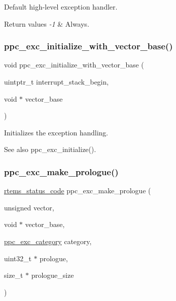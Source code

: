 Default high-\/level exception handler. 


\begin{DoxyRetVals}{Return values}
{\em -\/1} & Always. \\
\hline
\end{DoxyRetVals}
\mbox{\label{group__ppc__exc_ga29db27edaf745d8e0101ba4c4d8fddd2}} 
\subsubsection{\texorpdfstring{ppc\_exc\_initialize\_with\_vector\_base()}{ppc\_exc\_initialize\_with\_vector\_base()}}
{\footnotesize\ttfamily void ppc\+\_\+exc\+\_\+initialize\+\_\+with\+\_\+vector\+\_\+base (\begin{DoxyParamCaption}\item[{uintptr\+\_\+t}]{interrupt\+\_\+stack\+\_\+begin,  }\item[{void $\ast$}]{vector\+\_\+base }\end{DoxyParamCaption})}



Initializes the exception handling. 

\begin{DoxySeeAlso}{See also}
ppc\+\_\+exc\+\_\+initialize(). 
\end{DoxySeeAlso}
\mbox{\label{group__ppc__exc_gac2b2347bcb0a4b1e24af8eebf12197f3}} 
\subsubsection{\texorpdfstring{ppc\_exc\_make\_prologue()}{ppc\_exc\_make\_prologue()}}
{\footnotesize\ttfamily \mbox{\hyperlink{group__ClassicStatus_ga545d41846817eaba6143d52ee4d9e9fe}{rtems\+\_\+status\+\_\+code}} ppc\+\_\+exc\+\_\+make\+\_\+prologue (\begin{DoxyParamCaption}\item[{unsigned}]{vector,  }\item[{void $\ast$}]{vector\+\_\+base,  }\item[{\mbox{\hyperlink{group__ppc__exc_gab5c9ba70d9560d278d06983d7ea3babe}{ppc\+\_\+exc\+\_\+category}}}]{category,  }\item[{uint32\+\_\+t $\ast$}]{prologue,  }\item[{size\+\_\+t $\ast$}]{prologue\+\_\+size }\end{DoxyParamCaption})}



